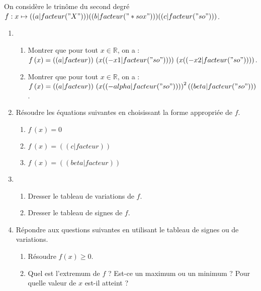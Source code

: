 \exercice
On considère le trinôme du second degré $f: x\mapsto (( a|facteur("X") )) (( b|facteur("*sox") )) (( c|facteur("so") ))$.

\begin{enumerate}
\item
\begin{enumerate}
    \item Montrer que pour tout $x\in\mathbb{R}$, on a : $f\,(x)=(( a|facteur )) \,\left( x (( -x1|facteur("so") )) \right) \, \left( x (( -x2|facteur("so") )) \right) $.
    \item Montrer que pour tout $x\in\mathbb{R}$, on a : $f\,(x)=(( a|facteur )) \,\left( x (( -alpha|facteur("so") )) \right)^2 (( beta|facteur("so") ))$.
\end{enumerate}
\item Résoudre les équations suivantes en choisissant la forme appropriée de $f$.
\begin{enumerate}
\item $f\,(x)=0$
\item $f\,(x)=(( c|facteur ))$
\item $f\,(x)=(( beta|facteur ))$
\end{enumerate}
\item
\begin{enumerate}
\item Dresser le tableau de variations de $f$.
\item Dresser le tableau de signes de $f$.
\end{enumerate}
\item Répondre aux questions suivantes en utilisant le tableau de signes ou de variations.
\begin{enumerate}
\item Résoudre $f(x)\geqslant0$.
\item Quel est l'extremum de $f$ ? Est-ce un maximum ou un minimum ? Pour quelle valeur de $x$ est-il atteint ?
\end{enumerate}
\end{enumerate}

